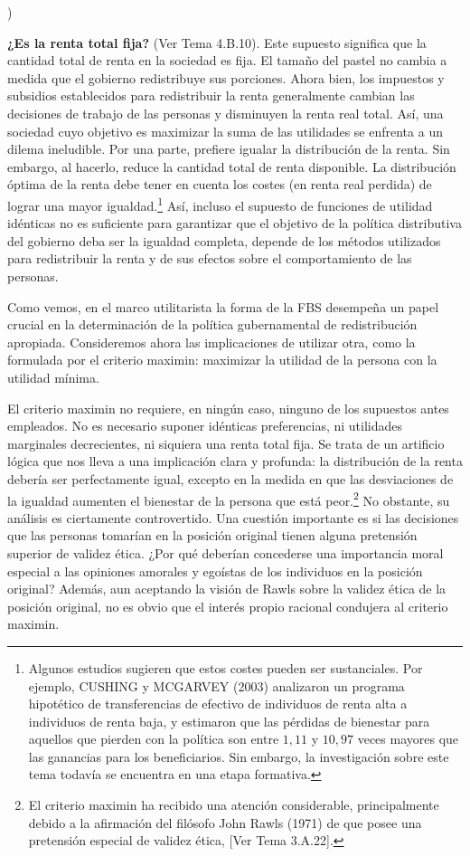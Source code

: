\documentclass[10pt,a4paper]{article}
\newcounter{alphaitem}
\newenvironment{la}
      {\begin{list}{\alph{alphaitem})}{%
          \usecounter{alphaitem}%
          \setlength{\leftmargin}{1cm}%
          \setlength{\parskip}{3pt}%
          \setlength{\itemsep}{0pt}%
          \setlength{\parsep}{0pt}%
      }}
      {\end{list}}
\newcommand{\authorfont}[1]{{\fontfamily{EBGaramond-TLF}\selectfont #1}}
\begin{document}
\begin{la}
    \item \textbf{¿Es la renta total fija?} (\authorfont{Ver Tema 4.B.10}). Este supuesto significa que la cantidad total de renta en la sociedad es fija. El tamaño del pastel no cambia a medida que el gobierno redistribuye sus porciones. Ahora bien, los impuestos y subsidios establecidos para redistribuir la renta generalmente cambian las decisiones de trabajo de las personas y disminuyen la renta real total. Así, una sociedad cuyo objetivo es maximizar la suma de las utilidades se enfrenta a un dilema ineludible. Por una parte, prefiere igualar la distribución de la renta. Sin embargo, al hacerlo, reduce la cantidad total de renta disponible. La distribución óptima de la renta debe tener en cuenta los costes (en renta real perdida) de lograr una mayor igualdad.\footnote{%
        Algunos estudios sugieren que estos costes pueden ser sustanciales. Por ejemplo, CUSHING y MCGARVEY (2003) analizaron un programa hipotético de transferencias de efectivo de individuos de renta alta a individuos de renta baja, y estimaron que las pérdidas de bienestar para aquellos que pierden con la política son entre $1,11$ y $10,97$ veces mayores que las ganancias para los beneficiarios. Sin embargo, la investigación sobre este tema todavía se encuentra en una etapa formativa.
    } Así, incluso el supuesto de funciones de utilidad idénticas no es suficiente para garantizar que el objetivo de la política distributiva del gobierno deba ser la igualdad completa, depende de los métodos utilizados para redistribuir la renta y de sus efectos sobre el comportamiento de las personas.
\end{la}

Como vemos, en el marco utilitarista la forma de la FBS desempeña un papel crucial en la determinación de la política gubernamental de redistribución apropiada. Consideremos ahora las implicaciones de utilizar otra, como la formulada por el criterio maximin: maximizar la utilidad de la persona con la utilidad mínima. 

El criterio maximin no requiere, en ningún caso, ninguno de los supuestos antes empleados. No es necesario suponer idénticas preferencias, ni utilidades marginales decrecientes, ni siquiera una renta total fija. Se trata de un artificio lógica que nos lleva a una implicación clara y profunda: la distribución de la renta debería ser perfectamente igual, excepto en la medida en que las desviaciones de la igualdad aumenten el bienestar de la persona que está peor.\footnote{%
    El criterio maximin ha recibido una atención considerable, principalmente debido a la afirmación del filósofo John Rawls (1971) de que posee una pretensión especial de validez ética, [\authorfont{Ver Tema 3.A.22}].
} No obstante, su análisis es ciertamente controvertido. Una cuestión importante es si las decisiones que las personas tomarían en la posición original tienen alguna pretensión superior de validez ética. ¿Por qué deberían concederse una importancia moral especial a las opiniones amorales y egoístas de los individuos en la posición original? Además, aun aceptando la visión de Rawls sobre la validez ética de la posición original, no es obvio que el interés propio racional condujera al criterio maximin. 
\end{document}
